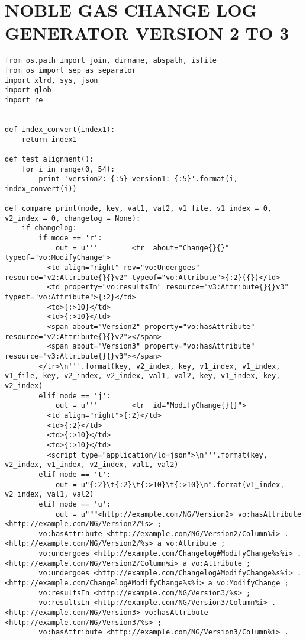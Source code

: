 \chapter{NOBLE GAS CHANGE LOG GENERATOR VERSION 2 TO 3} \label{app:noble23}
\begin{verbatim}
from os.path import join, dirname, abspath, isfile
from os import sep as separator
import xlrd, sys, json
import glob
import re


def index_convert(index1):
	return index1

def test_alignment():
	for i in range(0, 54):
		print 'version2: {:5} version1: {:5}'.format(i, index_convert(i))

def compare_print(mode, key, val1, val2, v1_file, v1_index = 0, v2_index = 0, changelog = None):
	if changelog:
		if mode == 'r':
			out = u'''        <tr  about="Change{}{}" typeof="vo:ModifyChange">
          <td align="right" rev="vo:Undergoes" resource="v2:Attribute{}{}v2" typeof="vo:Attribute">{:2}({})</td>
          <td property="vo:resultsIn" resource="v3:Attribute{}{}v3" typeof="vo:Attribute">{:2}</td>
          <td>{:>10}</td>
          <td>{:>10}</td>
          <span about="Version2" property="vo:hasAttribute" resource="v2:Attribute{}{}v2"></span>
          <span about="Version3" property="vo:hasAttribute" resource="v3:Attribute{}{}v3"></span>
        </tr>\n'''.format(key, v2_index, key, v1_index, v1_index, v1_file, key, v2_index, v2_index, val1, val2, key, v1_index, key, v2_index)
		elif mode == 'j':
			out = u'''        <tr  id="ModifyChange{}{}">
          <td align="right">{:2}</td>
          <td>{:2}</td>
          <td>{:>10}</td>
          <td>{:>10}</td>
          <script type="application/ld+json">\n'''.format(key, v2_index, v1_index, v2_index, val1, val2)
		elif mode == 't':
			out = u"{:2}\t{:2}\t{:>10}\t{:>10}\n".format(v1_index, v2_index, val1, val2)
		elif mode == 'u':
			out = u"""<http://example.com/NG/Version2> vo:hasAttribute <http://example.com/NG/Version2/%s> ;
        vo:hasAttribute <http://example.com/NG/Version2/Column%i> .
<http://example.com/NG/Version2/%s> a vo:Attribute ;
        vo:undergoes <http://example.com/Changelog#ModifyChange%s%i> .
<http://example.com/NG/Version2/Column%i> a vo:Attribute ;
        vo:undergoes <http://example.com/Changelog#ModifyChange%s%i> .
<http://example.com/Changelog#ModifyChange%s%i> a vo:ModifyChange ;
        vo:resultsIn <http://example.com/NG/Version3/%s> ;
        vo:resultsIn <http://example.com/NG/Version3/Column%i> .
<http://example.com/NG/Version3> vo:hasAttribute <http://example.com/NG/Version3/%s> ;
        vo:hasAttribute <http://example.com/NG/Version3/Column%i> .


\end{verbatim}
